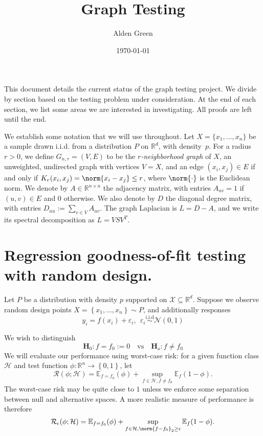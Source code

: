 \documentclass{article}
\newcommand{\Reals}{\mathbb{R}}
\newcommand{\set}[1]{\left\{#1\right\}}
\newcommand{\1}{\mathbf{1}}
\newcommand{\Rd}{\Reals^d}
\newcommand{\Ebb}{\mathbb{E}}
\theoremstyle{alden}
\theoremstyle{aldenthm}
\theoremstyle{definition}
\theoremstyle{remark}
\begin{document}
\title{Graph Testing}
\author{Alden Green}
\date{\today}
\maketitle

This document details the current status of the graph testing project. We divide by section based on the testing problem under consideration. At the end of each section, we list some areas we are interested in investigating. All proofs are left until the end.

We establish some notation that we will use throughout. Let $X = \{x_1,
\ldots, x_n\}$ be a sample drawn i.i.d. from a distribution $P$ on $\Rd$,
with density~$p$.  For a radius $r > 0$, we define $G_{n,r}=(V,E)$ to be the
\emph{$r$-neighborhood graph} of $X$, an unweighted, undirected graph with
vertices $V=X$, and an edge $(x_i,x_j) \in E$ if and only if $K_r(x_i,x_j) = \norm{x_i -x_j} \leq r$, where $\norm{\cdot}$ is the Euclidean norm. We denote by $A \in
\Reals^{n \times n}$ the adjacency matrix, with entries $A_{uv} = 1$ if
$(u,v) \in E$ and $0$ otherwise.  We also denote by $D$ the diagonal degree
matrix, with entries $D_{uu} := \sum_{v \in V} A_{uv}$. The graph Laplacian is $L = D - A$, and we write its spectral decomposition as $L = V S V^T$. 

\section{Regression goodness-of-fit testing with random design.}

Let $P$ be a distribution with density $p$ supported on $\mathcal{X} \subseteq \Reals^d$. Suppose we observe random design points $X = \set{x_1,\ldots,x_n} \sim P$, and additionally responses
\begin{equation}
\label{eqn:regression_known_variance}
y_i = f(x_i) + \varepsilon_i, ~~ \varepsilon_i \overset{\textrm{i.i.d}}{\sim} \mathcal{N}(0,1)
\end{equation} 

We wish to distinguish
\begin{equation*}
\mathbf{H}_0: f = f_0 := 0 \quad \textrm{vs} \quad \mathbf{H}_{\textrm{a}}: f \neq f_0
\end{equation*}
We will evaluate our performance using worst-case risk: for a given function class $\mathcal{H}$ and test function $\phi: \Reals^n \to \set{0,1}$, let
\begin{equation*}
\mathcal{R}(\phi; \mathcal{H}) = \Ebb_{f = f_0}(\phi) + \sup_{f \in \mathcal{H}, f \neq f_0} \Ebb_f(1 - \phi).
\end{equation*}
The worst-case risk may be quite close to $1$ unless we enforce some separation between null and alternative spaces. A more realistic measure of performance is therefore
\begin{equation*}
\mathcal{R}_{\epsilon}(\phi; \mathcal{H}) = \Ebb_{f = f_0}(\phi) + \sup_{f \in \mathcal{H}, \norm{f - f_0}_2 \geq \epsilon} \Ebb_f(1 - \phi).
\end{equation*}
\end{document}

